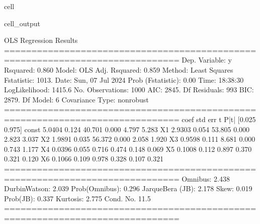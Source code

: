 \documentclass[letterpaper,10pt,english]{jupyterBook}
\begin{document}
\begin{sphinxuseclass}{cell}
\begin{sphinxVerbatimOutput}
\begin{sphinxuseclass}{cell_output}
\begin{sphinxVerbatim}[commandchars=\\\{\}]
                            OLS Regression Results                            
==============================================================================
Dep. Variable:                      y   R\PYGZhy{}squared:                       0.860
Model:                            OLS   Adj. R\PYGZhy{}squared:                  0.859
Method:                 Least Squares   F\PYGZhy{}statistic:                     1013.
Date:                Sun, 07 Jul 2024   Prob (F\PYGZhy{}statistic):               0.00
Time:                        18:38:30   Log\PYGZhy{}Likelihood:                \PYGZhy{}1415.6
No. Observations:                1000   AIC:                             2845.
Df Residuals:                     993   BIC:                             2879.
Df Model:                           6                                         
Covariance Type:            nonrobust                                         
==============================================================================
                 coef    std err          t      P\PYGZgt{}|t|      [0.025      0.975]
\PYGZhy{}\PYGZhy{}\PYGZhy{}\PYGZhy{}\PYGZhy{}\PYGZhy{}\PYGZhy{}\PYGZhy{}\PYGZhy{}\PYGZhy{}\PYGZhy{}\PYGZhy{}\PYGZhy{}\PYGZhy{}\PYGZhy{}\PYGZhy{}\PYGZhy{}\PYGZhy{}\PYGZhy{}\PYGZhy{}\PYGZhy{}\PYGZhy{}\PYGZhy{}\PYGZhy{}\PYGZhy{}\PYGZhy{}\PYGZhy{}\PYGZhy{}\PYGZhy{}\PYGZhy{}\PYGZhy{}\PYGZhy{}\PYGZhy{}\PYGZhy{}\PYGZhy{}\PYGZhy{}\PYGZhy{}\PYGZhy{}\PYGZhy{}\PYGZhy{}\PYGZhy{}\PYGZhy{}\PYGZhy{}\PYGZhy{}\PYGZhy{}\PYGZhy{}\PYGZhy{}\PYGZhy{}\PYGZhy{}\PYGZhy{}\PYGZhy{}\PYGZhy{}\PYGZhy{}\PYGZhy{}\PYGZhy{}\PYGZhy{}\PYGZhy{}\PYGZhy{}\PYGZhy{}\PYGZhy{}\PYGZhy{}\PYGZhy{}\PYGZhy{}\PYGZhy{}\PYGZhy{}\PYGZhy{}\PYGZhy{}\PYGZhy{}\PYGZhy{}\PYGZhy{}\PYGZhy{}\PYGZhy{}\PYGZhy{}\PYGZhy{}\PYGZhy{}\PYGZhy{}\PYGZhy{}\PYGZhy{}
const          5.0404      0.124     40.701      0.000       4.797       5.283
X1             2.9303      0.054     53.805      0.000       2.823       3.037
X2            \PYGZhy{}1.9891      0.035    \PYGZhy{}56.372      0.000      \PYGZhy{}2.058      \PYGZhy{}1.920
X3             0.9598      0.111      8.681      0.000       0.743       1.177
X4            \PYGZhy{}0.0396      0.055     \PYGZhy{}0.716      0.474      \PYGZhy{}0.148       0.069
X5            \PYGZhy{}0.1008      0.112     \PYGZhy{}0.897      0.370      \PYGZhy{}0.321       0.120
X6             0.1066      0.109      0.978      0.328      \PYGZhy{}0.107       0.321
==============================================================================
Omnibus:                        2.438   Durbin\PYGZhy{}Watson:                   2.039
Prob(Omnibus):                  0.296   Jarque\PYGZhy{}Bera (JB):                2.178
Skew:                           0.019   Prob(JB):                        0.337
Kurtosis:                       2.775   Cond. No.                         11.5
==============================================================================


\end{sphinxVerbatim}
\end{sphinxuseclass}
\end{sphinxVerbatimOutput}
\end{sphinxuseclass}
\end{document}
